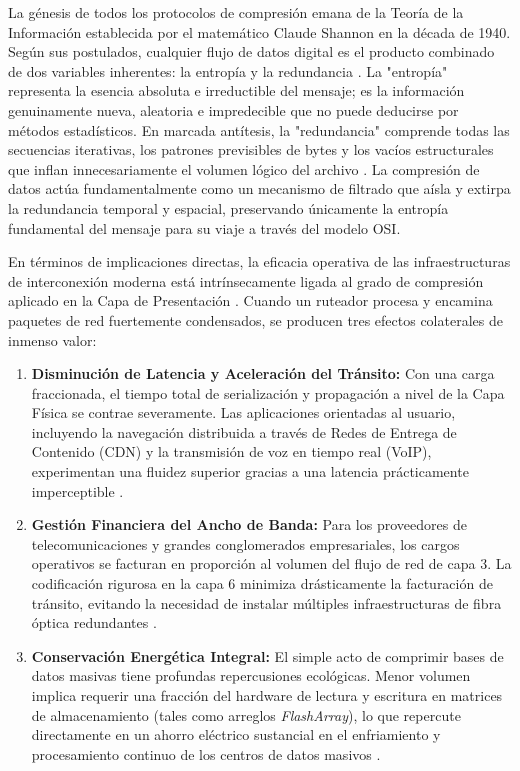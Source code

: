 \documentclass[a4paper,12pt]{article}
\begin{document}
La génesis de todos los protocolos de compresión emana de la Teoría de la Información establecida por el matemático Claude Shannon en la década de 1940. Según sus postulados, cualquier flujo de datos digital es el producto combinado de dos variables inherentes: la entropía y la redundancia \cite{wiki_comp}. La "entropía" representa la esencia absoluta e irreductible del mensaje; es la información genuinamente nueva, aleatoria e impredecible que no puede deducirse por métodos estadísticos. En marcada antítesis, la "redundancia" comprende todas las secuencias iterativas, los patrones previsibles de bytes y los vacíos estructurales que inflan innecesariamente el volumen lógico del archivo \cite{wiki_comp}. La compresión de datos actúa fundamentalmente como un mecanismo de filtrado que aísla y extirpa la redundancia temporal y espacial, preservando únicamente la entropía fundamental del mensaje para su viaje a través del modelo OSI. 

En términos de implicaciones directas, la eficacia operativa de las infraestructuras de interconexión moderna está intrínsecamente ligada al grado de compresión aplicado en la Capa de Presentación \cite{ibm_osi_layer6}. Cuando un ruteador procesa y encamina paquetes de red fuertemente condensados, se producen tres efectos colaterales de inmenso valor:

\begin{enumerate}
    \item \textbf{Disminución de Latencia y Aceleración del Tránsito:} Con una carga fraccionada, el tiempo total de serialización y propagación a nivel de la Capa Física se contrae severamente. Las aplicaciones orientadas al usuario, incluyendo la navegación distribuida a través de Redes de Entrega de Contenido (CDN) y la transmisión de voz en tiempo real (VoIP), experimentan una fluidez superior gracias a una latencia prácticamente imperceptible \cite{actian_comp}.
    \item \textbf{Gestión Financiera del Ancho de Banda:} Para los proveedores de telecomunicaciones y grandes conglomerados empresariales, los cargos operativos se facturan en proporción al volumen del flujo de red de capa 3. La codificación rigurosa en la capa 6 minimiza drásticamente la facturación de tránsito, evitando la necesidad de instalar múltiples infraestructuras de fibra óptica redundantes \cite{pure_comp, actian_comp}.
    \item \textbf{Conservación Energética Integral:} El simple acto de comprimir bases de datos masivas tiene profundas repercusiones ecológicas. Menor volumen implica requerir una fracción del hardware de lectura y escritura en matrices de almacenamiento (tales como arreglos \textit{FlashArray}), lo que repercute directamente en un ahorro eléctrico sustancial en el enfriamiento y procesamiento continuo de los centros de datos masivos \cite{pure_comp}.
\end{enumerate}
\end{document}
